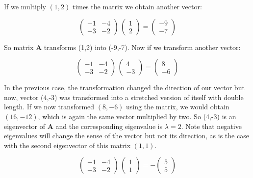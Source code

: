 \documentclass[12pt]{article}
\begin{document}
If we multiply $(1,2)$ times the matrix we obtain another vector:

\begin{equation}
	 \begin{pmatrix} -1 & -4\\ -3 & -2\end{pmatrix} \,  \begin{pmatrix} 1\\ 2\end{pmatrix}=\begin{pmatrix} -9 \\ -7\end{pmatrix}\nonumber
\end{equation}

So matrix $\mathbf{A}$ transforms  (1,2) into  (-9,-7). Now if  we transform another vector:

\begin{equation}
	\begin{pmatrix} -1 & -4\\ -3 & -2\end{pmatrix} \,  \begin{pmatrix} 4\\ -3\end{pmatrix}=\begin{pmatrix} 8 \\ -6\end{pmatrix}\nonumber
\end{equation}

In the previous case, the transformation changed the direction of our vector but now, vector (4,-3) was transformed into a stretched version of itself with double length. If we now transformed $(8,-6)$ using the matrix, we would obtain $(16,-12)$, which is again the same vector multiplied by two. So (4,-3) is an eigenvector of $\mathbf{A}$ and the corresponding eigenvalue is $\lambda=2$. Note that negative eigenvalues will change the sense of the vector but not its direction, as is the case with the second eigenvector of this matrix $(1,1)$.

\begin{equation}
	\begin{pmatrix} -1 & -4\\ -3 & -2\end{pmatrix} \,  \begin{pmatrix} 1\\ 1\end{pmatrix}=- \begin{pmatrix} 5 \\ 5\end{pmatrix}\nonumber
\end{equation}
\end{document}
